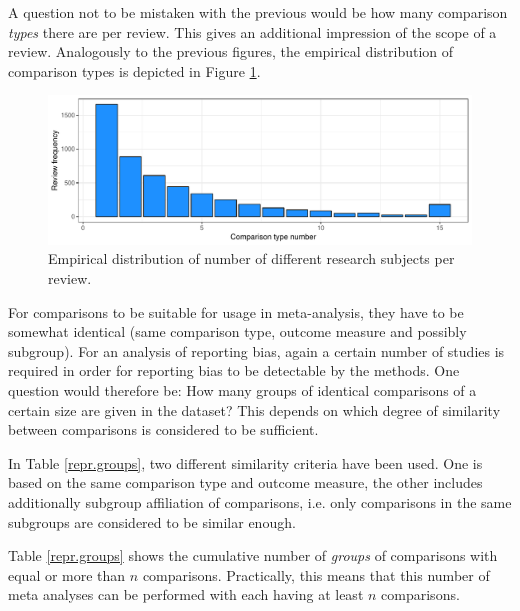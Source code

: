 \documentclass[11pt,a4paper,twoside]{book}\usepackage[]{graphicx}\usepackage[]{color}
\newenvironment{knitrout}{}{} %
\begin{document}
A question not to be mistaken with the previous would be how many comparison \textit{types} there are per review. This gives an additional impression of the scope of a review. Analogously to the previous figures, the empirical distribution of comparison types is depicted in Figure \ref{subjects.per.review}.


\begin{figure}
\begin{knitrout}
\color{fgcolor}

{\centering \includegraphics[width=\textwidth-3cm]{figure/ch02_figunnamed-chunk-12-1} 

}



\end{knitrout}
\caption{Empirical distribution of number of different research subjects per review.}
\label{subjects.per.review}
\end{figure}

For comparisons to be suitable for usage in meta-analysis, they have to be somewhat identical (same comparison type, outcome measure and possibly subgroup). For an analysis of reporting bias, again a certain number of studies is required in order for reporting bias to be detectable by the methods. One question would therefore be: How many groups of identical comparisons of a certain size are given in the dataset? This depends on which degree of similarity between comparisons is considered to be sufficient.

\vspace{0mm}
In Table \ref{repr.groups}, two different similarity criteria have been used. One is based on the same comparison type and outcome measure, the other includes additionally subgroup affiliation of comparisons, i.e. only comparisons in the same subgroups are considered to be similar enough.

\vspace{0mm}
Table \ref{repr.groups} shows the cumulative number of \textit{groups} of comparisons with equal or more than $n$ comparisons. Practically, this means that this number of meta analyses can be performed with each having at least $n$ comparisons.
\end{document}
